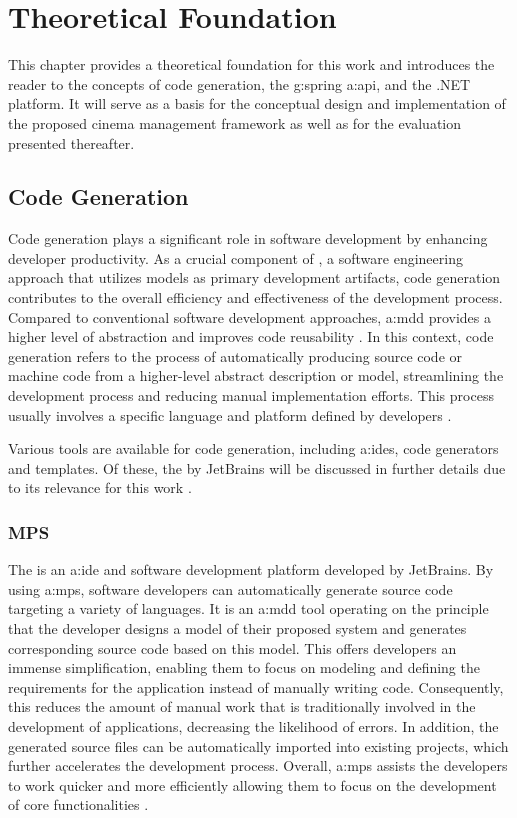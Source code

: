 \chapter{Theoretical Foundation}
\label{ch:foundation}

This chapter provides a theoretical foundation for this work and introduces the reader to the concepts of code generation, the \gls{g:spring} \gls{a:api}, and the .NET platform. It will serve as a basis for the conceptual design and implementation of the proposed cinema management framework as well as for the evaluation presented thereafter.

\section{Code Generation}

Code generation plays a significant role in software development by enhancing developer productivity. As a crucial component of , a software engineering approach that utilizes models as primary development artifacts, code generation contributes to the overall efficiency and effectiveness of the development process. Compared to conventional software development approaches, \gls{a:mdd} provides a higher level of abstraction and improves code reusability \cite{peldszus2022security}. In this context, code generation refers to the process of automatically producing source code or machine code from a higher-level abstract description or model, streamlining the development process and reducing manual implementation efforts. This process usually involves a specific language and platform defined by developers \cite{peldszus2022security}.

Various tools are available for code generation, including \glspl{a:ide}, code generators and templates. Of these, the  by JetBrains will be discussed in further details due to its relevance for this work \cite{pech2013jetbrains}.

\subsection{MPS}

The  is an \gls{a:ide} and software development platform developed by JetBrains. By using \gls{a:mps}, software developers can automatically generate source code targeting a variety of languages. It is an \gls{a:mdd} tool operating on the principle that the developer designs a model of their proposed system and generates corresponding source code based on this model. This offers developers an immense simplification, enabling them to focus on modeling and defining the requirements for the application instead of manually writing code. Consequently, this reduces the amount of manual work that is traditionally involved in the development of applications, decreasing the likelihood of errors. In addition, the generated source files can be automatically imported into existing projects, which further accelerates the development process. Overall, \gls{a:mps} assists the developers to work quicker and more efficiently allowing them to focus on the development of core functionalities \cite{pech2013jetbrains}.

